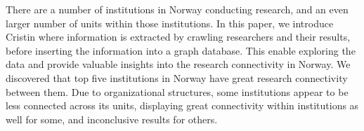 There are a number of institutions in Norway conducting research, and an even larger number of units within those institutions.
In this paper, we introduce Cristin\cite{CRISTIN-about} where information is extracted by crawling researchers and their results, before inserting the information into a graph database.
This enable exploring the data and provide valuable insights into the research connectivity in Norway.
We discovered that top five institutions in Norway have great research connectivity between them.
Due to organizational structures, some institutions appear to be less connected across its units, displaying great connectivity within institutions as well for some, and inconclusive results for others.
